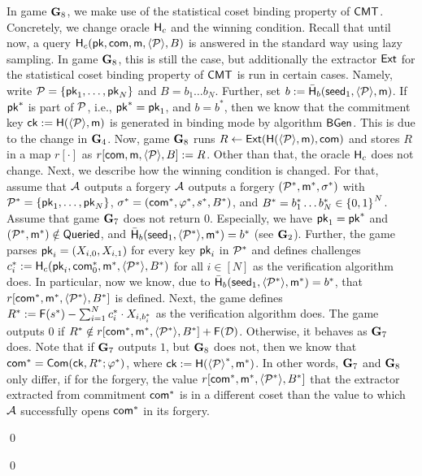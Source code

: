\documentclass[version=final]{iacrcc}
\renewenvironment{proof}{\begin{oldproof}}{\qed\end{oldproof}}
\theoremstyle{mytheorem}				\newtheorem{theorem}{Theorem}
\theoremstyle{myplain}
\theoremstyle{mydefinition}
\theoremstyle{myremark}
\begin{document}
\begin{proof}[of \cref{lemma:toothpicks:tight:completeness}]
\begin{proof}
	 In game $\mbox{\textbf{G}}_8$, we make use of the statistical coset binding property of $\mathsf{CMT}$.
	Concretely, we change oracle $\mathsf{H}_c$ and the winning condition.
	Recall that until now, a query $\mathsf{H}_c({\mathsf{pk}},\mathsf{com},\mathsf{m},{\langle{{\ensuremath{\mathcal{P}}}}\rangle},B)$ is answered in the standard way using lazy sampling.
	In game $\mbox{\textbf{G}}_8$, this is still the case, but additionally the extractor ${\mathsf{Ext}}$ for the statistical coset binding property of $\mathsf{CMT}$ is run in certain cases.
	Namely, write ${\mathcal{P}} = \{{\mathsf{pk}}_1,\dots,{\mathsf{pk}}_N\}$ and $B = b_1\dots b_N$. 
	Further, set $b := \bar{\mathsf{H}}_b(\mathsf{seed}_1,{\langle{{\ensuremath{\mathcal{P}}}}\rangle},\mathsf{m})$.
	If ${\mathsf{pk}}^*$ is part of ${\mathcal{P}}$, i.e., ${\mathsf{pk}}^* = {\mathsf{pk}}_1$, and $b = b^*$, then we know that the commitment key ${\mathsf{ck}} := \mathsf{H}({\langle{{\ensuremath{\mathcal{P}}}}\rangle},\mathsf{m})$ is generated in binding mode by algorithm ${\mathsf{BGen}}$. This is due to the change in $\mbox{\textbf{G}}_4$.
	Now, game $\mbox{\textbf{G}}_8$ runs $R \leftarrow {\ensuremath{\mathsf{Ext}}}(\mathsf{H}({\langle{{\ensuremath{\mathcal{P}}}}\rangle},\mathsf{m}),\mathsf{com})$ and stores $R$ in a map $r[\cdot]$ as $r[\mathsf{com},\mathsf{m},{\langle{{\ensuremath{\mathcal{P}}}}\rangle},B]:=R$.
	Other than that, the oracle $\mathsf{H}_c$ does not change.
	Next, we describe how the winning condition is changed.
	For that, assume that $\mathcal{A}$ outputs a forgery $\mathcal{A}$ outputs a forgery $({\mathcal{P}}^*,\mathsf{m}^*,\sigma^*)$ with ${\mathcal{P}}^* = \{ {\mathsf{pk}}_1,\dots,{\mathsf{pk}}_N\}$, $\sigma^*=(\mathsf{com}^*,\varphi^*,s^*,B^*)$, and $B^* = b^*_1\dots b^*_N \in {\ensuremath{{\{0,1\}}^{\relax}}}^N$.
	Assume that game $\mbox{\textbf{G}}_7$ does not return $0$.
	Especially, we have ${\mathsf{pk}}_1 = {\mathsf{pk}}^*$ and $({\mathcal{P}}^*,\mathsf{m}^*) \notin \mathsf{Queried}$, and $\bar{\Hash}_b(\seed_1,\encode{\PKList^*},\mes^*) = b^*$ (see $\mbox{\textbf{G}}_2$).
	Further, the game parses ${\mathsf{pk}}_i = (X_{i,0},X_{i,1})$ for every key ${\mathsf{pk}}_i$ in ${\mathcal{P}}^*$ and defines challenges $c^*_{i} := \Hash_c(\pk_i,\com^*_0,\mes^*,\encode{\PKList^*},B^*)$ for all $i\in[N]$ as the verification algorithm does. 
	In particular, now we know, due to $\bar{\Hash}_b(\seed_1,\encode{\PKList^*},\mes^*) = b^*$, that $r[\com^*,\mes^*,\encode{\PKList^*},B^*]$ is defined.
	Next, the game defines $R^*:= {\mathsf{F}}(s^*)-\sum_{i=1}^N c^*_{i}\cdot X_{i,b^*_i}$ as the verification algorithm does.
	The game outputs $0$ if $R^* \notin r[\com^*,\mes^*,\encode{\PKList^*},B^*] + \LFunction(\DDD)$.
	Otherwise, it behaves as $\mbox{\textbf{G}}_7$ does.
	Note that if $\mbox{\textbf{G}}_7$ outputs $1$, but $\mbox{\textbf{G}}_8$ does not, then we know that $\mathsf{com}^* = {\mathsf{Com}}({\mathsf{ck}},R^*;\varphi^*)$, where ${\mathsf{ck}} := \mathsf{H}({\langle{{\ensuremath{\mathcal{P}}}}\rangle}^*,\mathsf{m}^*)$.
	In other words, $\mbox{\textbf{G}}_7$ and $\mbox{\textbf{G}}_8$ only differ, if for the forgery, the value $r[\com^*,\mes^*,\encode{\PKList^*},B^*]$ that the extractor extracted from commitment $\mathsf{com}^*$ is in a different coset than the value to which $\mathcal{A}$ successfully opens $\mathsf{com}^*$ in its forgery.

\end{proof}
\end{proof}
\end{document}
